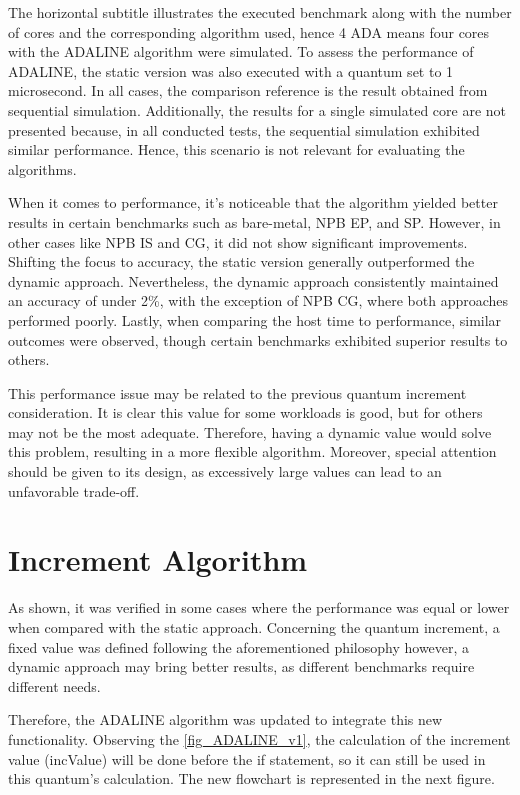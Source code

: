 The horizontal subtitle illustrates the executed benchmark along with the number of cores and the corresponding algorithm used, hence 4 ADA 
means four cores with the ADALINE algorithm were simulated. To assess the performance of ADALINE, the static version was also executed with 
a quantum set to 1 microsecond. In all cases, the comparison reference is the result obtained from sequential simulation. Additionally, the 
results for a single simulated core are not presented because, in all conducted tests, the sequential simulation exhibited similar performance. 
Hence, this scenario is not relevant for evaluating the algorithms.

When it comes to performance, it's noticeable that the algorithm yielded better results in certain benchmarks such as bare-metal, NPB EP, and SP. 
However, in other cases like NPB IS and CG, it did not show significant improvements. Shifting the focus to accuracy, the static version generally 
outperformed the dynamic approach. Nevertheless, the dynamic approach consistently maintained an accuracy of under 2\%, with the exception of 
NPB CG, where both approaches performed poorly. Lastly, when comparing the host time to performance, similar outcomes were observed, though 
certain benchmarks exhibited superior results to others.

This performance issue may be related to the previous quantum increment consideration. It is clear this value for some workloads is good, but 
for others may not be the most adequate. Therefore, having a dynamic value would solve this problem, resulting in a more flexible algorithm. 
Moreover, special attention should be given to its design, as excessively large values can lead to an unfavorable trade-off.


\section{Increment Algorithm}

As shown, it was verified in some cases where the performance was equal or lower when compared with the static approach. Concerning the quantum 
increment, a fixed value was defined following the aforementioned philosophy however, a dynamic approach may bring better results, as different 
benchmarks require different needs. 

Therefore, the ADALINE algorithm was updated to integrate this new functionality. Observing the \autoref{fig_ADALINE_v1}, the calculation of the 
increment value (incValue) will be done before the if statement, so it can still be used in this quantum's calculation. The new flowchart is 
represented in the next figure.

